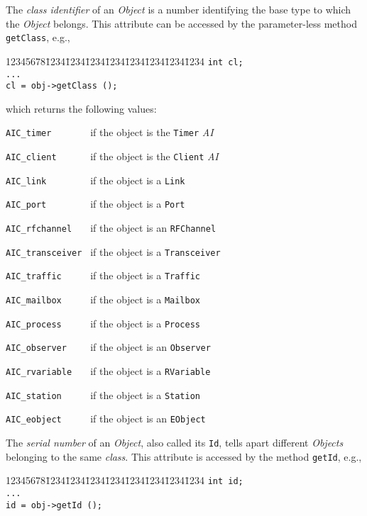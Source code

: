 The {\em class identifier\/} of an {\em Object\/} is a number
identifying the base {\smurph}
type to which the {\em Object\/} belongs.
This attribute can be accessed by the parameter-less method
{\tt getClass}, e.g.,
{\tt\begin{tabbing}
12345678\=1234\=1234\=1234\=1234\=1234\=1234\=1234\=1234\kill
\> {\tt int  cl;}\\
\> {\tt ...}\\
\> {\tt cl = obj->getClass ();}
\end{tabbing}}
\noindent
which returns the following values:

\bigskip

\noindent
{\tt AIC\_timer~~~~~~~} if the object is the {\tt Timer} {\em AI}

\noindent
{\tt AIC\_client~~~~~~} if the object is the {\tt Client} {\em AI}

\noindent
{\tt AIC\_link~~~~~~~~} if the object is a {\tt Link}

\noindent
{\tt AIC\_port~~~~~~~~} if the object is a {\tt Port}

\noindent
{\tt AIC\_rfchannel~~~} if the object is an {\tt RFChannel}

\noindent
{\tt AIC\_transceiver~} if the object is a {\tt Transceiver}

\noindent
{\tt AIC\_traffic~~~~~} if the object is a {\tt Traffic}

\noindent
{\tt AIC\_mailbox~~~~~} if the object is a {\tt Mailbox}

\noindent
{\tt AIC\_process~~~~~} if the object is a {\tt Process}

\noindent
{\tt AIC\_observer~~~~} if the object is an {\tt Observer}

\noindent
{\tt AIC\_rvariable~~~} if the object is a {\tt RVariable}

\noindent
{\tt AIC\_station~~~~~} if the object is a {\tt Station}

\noindent
{\tt AIC\_eobject~~~~~} if the object is an {\tt EObject}

\bigskip

The {\em serial number\/}
of an {\em Object}, also called its {\tt Id}, tells apart
different {\em Objects\/} belonging to the same {\em class}.
This attribute is accessed by the method {\tt getId}, e.g.,
{\tt\begin{tabbing}
12345678\=1234\=1234\=1234\=1234\=1234\=1234\=1234\=1234\kill
 \> {\tt int  id;}\\
 \> {\tt ...}\\
 \> {\tt id = obj->getId ();}
\end{tabbing}}

